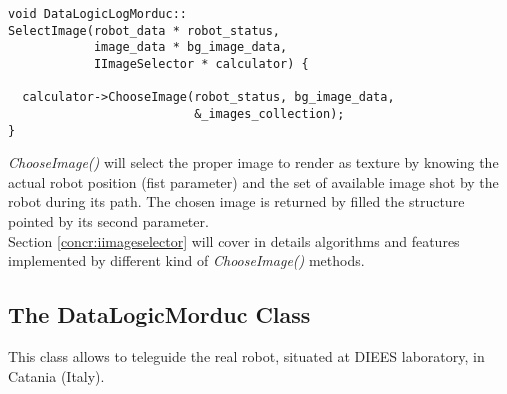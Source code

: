 \begin{lstlisting}[caption={\texttt{DataLogicLogSimulator::SelectImage()} method},
    label={code:datalogiclogmorduc:selectimage}, frame=trBL]
void DataLogicLogMorduc::
SelectImage(robot_data * robot_status,
            image_data * bg_image_data,
            IImageSelector * calculator) {

  calculator->ChooseImage(robot_status, bg_image_data,
                          &_images_collection);
}

\end{lstlisting}

\textit{ChooseImage()} will select the proper image to render as texture
by knowing the actual robot position (fist parameter) and the set of available
image shot by the robot during its path. The chosen image is returned by filled
the structure pointed by its second parameter.
\\
Section \ref{concr:iimageselector} will cover in details algorithms and
features implemented by different kind of \textit{ChooseImage()} methods.


\subsection{The DataLogicMorduc Class}
\label{concr:idatalogic:datalogicmorduc}

This class allows \framework{} to teleguide the real \morduc{}
robot, situated at DIEES laboratory, in Catania (Italy).
